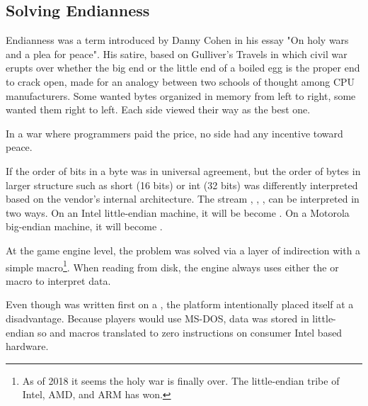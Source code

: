 \subsection{Solving Endianness}
Endianness was a term introduced by Danny Cohen in his essay "On holy wars and a plea for peace". His satire, based on Gulliver's Travels in which civil war erupts over whether the big end or the little end of a boiled egg is the proper end to crack open, made for an analogy between two schools of thought among CPU manufacturers. Some wanted bytes organized in memory from left to right, some wanted them right to left. Each side viewed their way as the best one.\\
\par
In a war where programmers paid the price, no side had any incentive toward peace.



If the order of bits in a byte was in universal agreement, but the order of bytes in larger structure such as short (16 bits) or int (32 bits) was differently interpreted based on the vendor's internal architecture. The stream , , ,  can be interpreted in two ways. On an Intel little-endian machine, it will be become . On a Motorola big-endian machine, it will become .\\
\par
{}
\par
At the game engine level, the problem was solved via a layer of indirection with a simple macro\footnote{As of 2018 it seems the holy war is finally over. The little-endian tribe of Intel, AMD, and ARM has won.}. When reading from disk, the engine always uses either the  or  macro to interpret data.\\
\par
{}
\par
{}
\par
Even though \doom{} was written first on a \NeXT, the platform intentionally placed itself at a disadvantage. Because players would use MS-DOS, data was stored in little-endian so  and  macros translated to zero instructions on consumer Intel based hardware.



